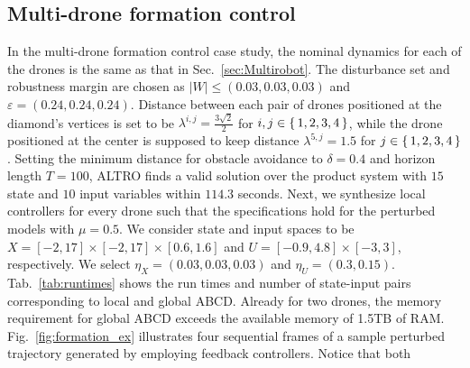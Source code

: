 \subsection{Multi-drone formation control}
\label{sec:formation_control}

In the multi-drone formation control case study, the nominal dynamics for each of the drones is the same as that in 
Sec.~\ref{sec:Multirobot}. 
The disturbance set and robustness margin are chosen as $|W|\leq (0.03,0.03,0.03)$ and $\varepsilon=(0.24,0.24,0.24)$. 
Distance between each pair of drones positioned at the diamond's vertices is set to be $\lambda^{i,j}=\frac{3\sqrt{2}}{2}$ 
for $i,j\in\set{1,2,3,4}$, while the drone positioned at the center is supposed to keep distance $\lambda^{5,j}=1.5$ 
for $j\in\set{1,2,3,4}$. 
Setting the minimum distance for obstacle avoidance to $\delta=0.4$ and horizon length $T=100$, 
ALTRO finds a valid solution over the product system with $15$ state and $10$ input variables within $114.3$ seconds.
Next, we synthesize local controllers for every drone such that the specifications hold for the perturbed models with $\mu=0.5$. %
We consider state and input spaces to be $X=[-2,17]\times[-2,17]\times[0.6,1.6]$ and
$U=[-0.9,4.8]\times[-3,3]$, respectively. We select $\eta_{X}=(0.03,0.03,0.03)$ and
$\eta_{U}=(0.3,0.15)$. %
Tab.~\ref{tab:runtimes} shows the run times and number of state-input pairs corresponding to local and global ABCD. 
Already for two drones, the memory requirement for global ABCD exceeds the available memory of 1.5TB of RAM.
Fig.~\ref{fig:formation_ex} illustrates four sequential frames of a sample perturbed trajectory generated by employing 
feedback controllers. Notice that both 
